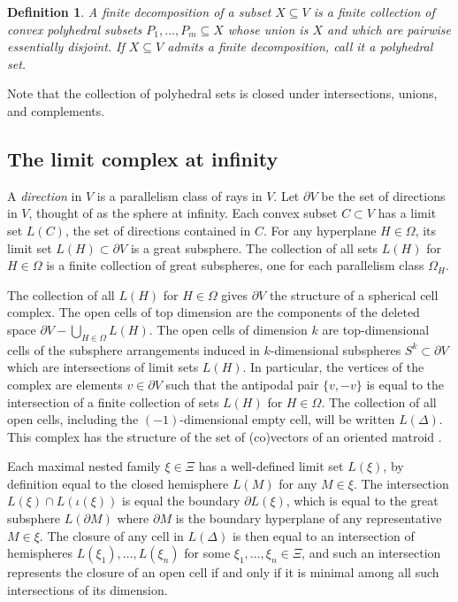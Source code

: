 \documentclass[11pt]{amsart}
\newtheorem{definition}[theorem]{Definition}
\numberwithin{table}{section}
\numberwithin{figure}{section}
\theoremstyle{remark}
\begin{document}
\begin{definition}
  A {\em finite decomposition} of a subset $X\subseteq V$ is a finite
  collection of convex polyhedral subsets $P_1,\dotsc, P_m\subseteq X$
  whose union is $X$ and which are pairwise essentially disjoint. If
  $X\subseteq V$ admits a finite decomposition, call it a {\em
    polyhedral set}.
\end{definition}

Note that the collection of polyhedral sets is closed under
intersections, unions, and complements.

\subsection{The limit complex at infinity}

A {\em direction} in $V$ is a parallelism class of rays in $V$. Let
$\partial V$ be the set of directions in $V$, thought of as the sphere
at infinity. Each convex subset $C\subset V$ has a limit set $L(C)$,
the set of directions contained in $C$. For any hyperplane
$H\in \Omega$, its limit set $L(H) \subset \partial V$ is a great
subsphere. The collection of all sets $L(H)$ for $H\in\Omega$ is a
finite collection of great subspheres, one for each parallelism class
$\Omega_H$.

The collection of all $L(H)$ for $H\in \Omega$ gives $\partial V$ the
structure of a spherical cell complex. The open cells of top dimension
are the components of the deleted space
$\partial V - \bigcup_{H\in \Omega} L(H)$. The open cells of dimension
$k$ are top-dimensional cells of the subsphere arrangements induced in
$k$-dimensional subspheres $S^k \subset \partial V$ which are
intersections of limit sets $L(H)$. In particular, the vertices of the
complex are elements $v\in \partial V$ such that the antipodal pair
$\{v, -v\}$ is equal to the intersection of a finite collection of
sets $L(H)$ for $H\in \Omega$. The collection of all open cells,
including the $(-1)$-dimensional empty cell, will be written
$L(\Delta)$. This complex has the structure of the set of (co)vectors
of an oriented matroid \cite[\S1.3.4]{Anderson}.

Each maximal nested family $\xi\in \Xi$ has a well-defined limit
set $L(\xi)$, by definition equal to the closed hemisphere $L(M)$
for any $M\in \xi$. The intersection
$L(\xi) \cap L(\iota(\xi))$ is equal the boundary
$\partial L(\xi)$, which is equal to the great subsphere
$L(\partial M)$ where $\partial M$ is the boundary hyperplane of any
representative $M\in \xi$. The closure of any cell in $L(\Delta)$
is then equal to an intersection of hemispheres
$L(\xi_1),\dotsc, L(\xi_n)$ for some
$\xi_1,\dotsc,\xi_n \in \Xi$, and such an intersection
represents the closure of an open cell if and only if it is minimal
among all such intersections of its dimension.
\end{document}
